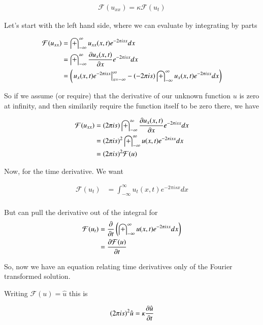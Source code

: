\documentclass{article}
\newcommand{\FF}[0]{\mathcal{F}}
\newcommand{\IIinf}[0]{ \int_{-\infty}^\infty }
\begin{document}
\begin{align*}
\FF(u_{xx}) = \kappa \FF(u_t)
\end{align*}

Let's start with the left hand side, where we can evaluate by integrating by parts

\begin{align*}
\FF(u_{xx}) 
&= 
\IIinf u_{xx}(x, t) e^{- 2 \pi i s x } dx \\
&= 
\IIinf \PD{x}{u_x(x, t)} e^{- 2 \pi i s x } dx \\
&= 
\left(
{\left. u_x(x, t) e^{- 2 \pi i s x } \right\vert}_{x= -\infty}^\infty
-( - 2 \pi i s ) \IIinf u_x(x, t) e^{- 2 \pi i s x } dx 
\right) \\
\end{align*}

So if we assume (or require) that the derivative of our unknown function $u$ is zero at infinity, and then similarily
require the function itself to be zero there, we have

\begin{align*}
\FF(u_{xx}) 
&= 
( 2 \pi i s ) \IIinf \PD{x}{u_x(x, t)} e^{- 2 \pi i s x } dx  \\
&= 
( 2 \pi i s )^2 \IIinf u(x, t) e^{- 2 \pi i s x } dx  \\
&= ( 2 \pi i s )^2 \FF(u)
\end{align*}

Now, for the time derivative.  We want

\begin{align*}
\FF(u_t) &= 
\IIinf u_t(x, t) e^{- 2 \pi i s x } dx \\
\end{align*}

But can pull the derivative out of the integral for
\begin{align*}
\FF(u_t)
&= \PD{t}{} \left(
\IIinf u(x, t) e^{- 2 \pi i s x } dx \right) \\
&= \PD{t}{\FF(u)} 
\end{align*}

So, now we have an equation relating time derivatives only of the Fourier transformed solution.

Writing $\FF(u) = \hat{u}$ this is

\begin{align}\label{eqn:toSolveFreq}
( 2 \pi i s )^2 \hat{u} = \kappa \PD{t}{\hat{u}}
\end{align}
\end{document}
